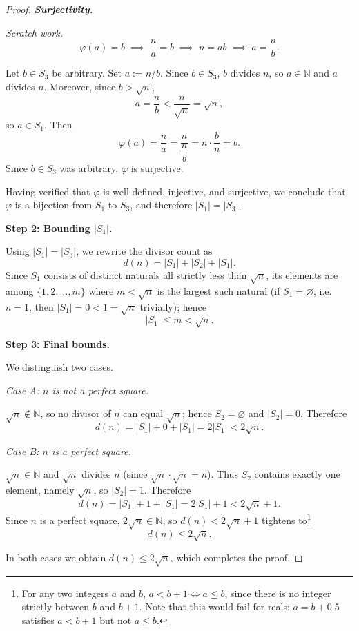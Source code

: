 \documentclass[12pt]{article}
\theoremstyle{remark}
\begin{document}
\begin{proof}
\bigskip

\pagebreak
\noindent\textbf{\textit{Surjectivity.}}

\smallskip
\noindent\textit{Scratch work.}\;
\[
    \varphi(a) = b
    \;\implies\; \frac{n}{a} = b
    \;\implies\; n = ab
    \;\implies\; a = \frac{n}{b}.
\]

\noindent
Let $b \in S_3$ be arbitrary. Set $a := n/b$. Since $b \in S_3$,
$b$ divides $n$, so $a \in \mathbb{N}$ and $a$ divides $n$. Moreover,
since $b > \sqrt{n}$,
\[
    a = \frac{n}{b} < \frac{n}{\sqrt{n}} = \sqrt{n},
\]
so $a \in S_1$. Then
\[
    \varphi(a) = \frac{n}{a} = \frac{n}{\dfrac{n}{b}} = n \cdot \frac{b}{n} = b.
\]
Since $b \in S_3$ was arbitrary, $\varphi$ is surjective.

\bigskip
\noindent
Having verified that $\varphi$ is well-defined, injective, and surjective,
we conclude that $\varphi$ is a bijection from $S_1$ to $S_3$, and therefore
$|S_1| = |S_3|$.


\bigskip
\noindent\textbf{Step 2: Bounding $|S_1|$.}

Using $|S_1| = |S_3|$, we rewrite the divisor count as
\[
    d(n) = |S_1| + |S_2| + |S_1|.
\]
Since $S_1$ consists of distinct naturals all strictly less than $\sqrt{n}$,
its elements are among $\{1, 2, \ldots, m\}$ where $m < \sqrt{n}$ is the
largest such natural (if $S_1 = \varnothing$, i.e.\ $n = 1$, then
$|S_1| = 0 < 1 = \sqrt{n}$ trivially); hence
\[
    |S_1| \leq m < \sqrt{n}.
\]


\noindent\textbf{Step 3: Final bounds.}

We distinguish two cases.

\medskip
\noindent\textit{Case A: $n$ is not a perfect square.}

$\sqrt{n} \notin \mathbb{N}$, so no divisor of $n$ can equal $\sqrt{n}$; hence
$S_2 = \varnothing$ and $|S_2| = 0$.  Therefore
\[
    d(n) = |S_1| + 0 + |S_1| = 2|S_1| < 2\sqrt{n}.
\]

\medskip
\noindent\textit{Case B: $n$ is a perfect square.}

$\sqrt{n} \in \mathbb{N}$ and $\sqrt{n}$ divides $n$ (since
$\sqrt{n} \cdot \sqrt{n} = n$).  Thus $S_2$ contains exactly one element,
namely $\sqrt{n}$, so $|S_2| = 1$.  Therefore
\[
    d(n) = |S_1| + 1 + |S_1| = 2|S_1| + 1 < 2\sqrt{n} + 1.
\]
Since $n$ is a perfect square, $2\sqrt{n} \in \mathbb{N}$, so $d(n) < 2\sqrt{n}+1$
tightens to\footnote{For any two integers $a$ and $b$, $a < b + 1 \Leftrightarrow a \leq b$,
since there is no integer strictly between $b$ and $b+1$. Note that this would
fail for reals: $a = b + 0.5$ satisfies $a < b+1$ but not $a \leq b$.}
\[
    d(n) \leq 2\sqrt{n}.
\]

\medskip
\noindent In both cases we obtain $d(n) \leq 2\sqrt{n}$, which completes the
proof.
\end{proof}
\end{document}
